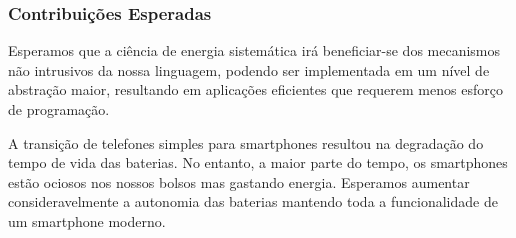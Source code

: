 \documentclass[12pt,english]{amsart}
\begin{document}
\subsubsection{\textbf{Contribuições Esperadas}}

Esperamos que a ciência de energia sistemática irá beneficiar-se dos mecanismos
não intrusivos da nossa linguagem, podendo ser implementada em um nível de
abstração maior, resultando em aplicações eficientes que requerem menos esforço
de programação.

A transição de telefones simples para smartphones resultou na degradação do
tempo de vida das baterias.
No entanto, a maior parte do tempo, os smartphones estão ociosos nos nossos
bolsos mas gastando energia.
Esperamos aumentar consideravelmente a autonomia das baterias mantendo toda a
funcionalidade de um smartphone moderno.

\newpage


\end{document}
